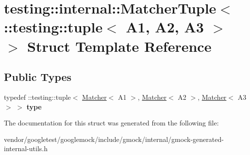 \hypertarget{structtesting_1_1internal_1_1_matcher_tuple_3_01_1_1testing_1_1tuple_3_01_a1_00_01_a2_00_01_a3_01_4_01_4}{}\section{testing\+:\+:internal\+:\+:Matcher\+Tuple$<$ \+:\+:testing\+:\+:tuple$<$ A1, A2, A3 $>$ $>$ Struct Template Reference}
\label{structtesting_1_1internal_1_1_matcher_tuple_3_01_1_1testing_1_1tuple_3_01_a1_00_01_a2_00_01_a3_01_4_01_4}
\subsection*{Public Types}
\begin{DoxyCompactItemize}
\item 
\mbox{\label{structtesting_1_1internal_1_1_matcher_tuple_3_01_1_1testing_1_1tuple_3_01_a1_00_01_a2_00_01_a3_01_4_01_4_a14ce558da46f2d3829b2dfacdab2c980}} 
typedef \+::testing\+::tuple$<$ \mbox{\hyperlink{classtesting_1_1_matcher}{Matcher}}$<$ A1 $>$, \mbox{\hyperlink{classtesting_1_1_matcher}{Matcher}}$<$ A2 $>$, \mbox{\hyperlink{classtesting_1_1_matcher}{Matcher}}$<$ A3 $>$ $>$ {\bfseries type}
\end{DoxyCompactItemize}


The documentation for this struct was generated from the following file\+:\begin{DoxyCompactItemize}
\item 
vendor/googletest/googlemock/include/gmock/internal/gmock-\/generated-\/internal-\/utils.\+h\end{DoxyCompactItemize}
